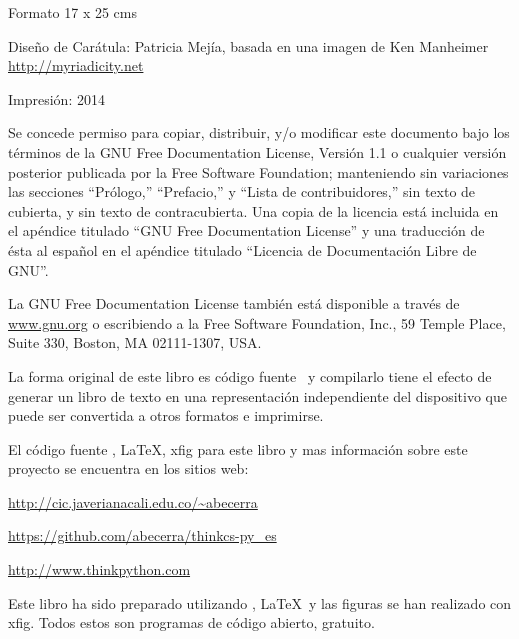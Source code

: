 {\scriptsize{}Formato 17 x 25 cms}\\
{\scriptsize{} %

{\scriptsize{}Diseño de Carátula: Patricia Mejía, basada en una imagen
de Ken Manheimer }\\
{\scriptsize{}\url{ http://myriadicity.net}}{\scriptsize \par}

{\scriptsize{}Impresión: 2014} \newpage{}

\thispagestyle{empty} \vspace{0.25in}

Se concede permiso para copiar, distribuir, y/o modificar este documento
bajo los términos de la GNU Free Documentation License, Versión 1.1
o cualquier versión posterior publicada por la Free Software Foundation;
manteniendo sin variaciones las secciones ``Prólogo,'' ``Prefacio,''
y ``Lista de contribuidores,'' sin texto de cubierta, y sin texto
de contracubierta. Una copia de la licencia está incluida en el apéndice
titulado ``GNU Free Documentation License'' y una traducción de
ésta al español en el apéndice titulado ``Licencia de Documentación
Libre de GNU''.

La GNU Free Documentation License también está disponible a través
de \url{www.gnu.org} o escribiendo a la Free Software Foundation,
Inc., 59 Temple Place, Suite 330, Boston, MA 02111-1307, USA.

La forma original de este libro es código fuente \LyX{}\ y compilarlo
tiene el efecto de generar un libro de texto en una representación
independiente del dispositivo que puede ser convertida a otros formatos
e imprimirse.

El código fuente \LyX{}, \LaTeX{}, xfig para este libro y mas información
sobre este proyecto se encuentra en los sitios web:

\url{ http://cic.javerianacali.edu.co/~abecerra}

\url{https://github.com/abecerra/thinkcs-py_es}

\url{   http://www.thinkpython.com}

Este libro ha sido preparado utilizando \LyX{}, \LaTeX{}\ y las
figuras se han realizado con xfig. Todos estos son programas de código
abierto, gratuito.

\vspace{0.25in}

\newpage{}

}
